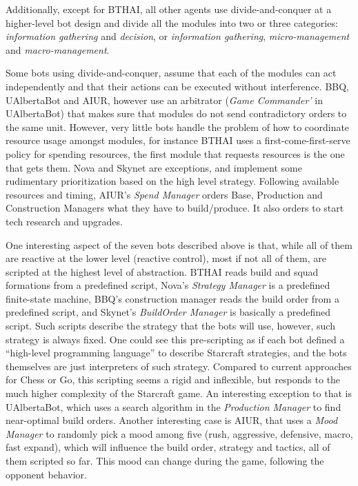 \documentclass[journal]{IEEEtran}
\begin{document}
Additionally, except for BTHAI, all other agents use divide-and-conquer at a higher-level bot design and divide all the modules into two or three categories: {\em information gathering} and {\em decision}, or {\em information gathering}, {\em micro-management} and {\em macro-management}.

Some bots using divide-and-conquer, assume that each of the modules can act independently and that their actions can be executed without interference. BBQ, UAlbertaBot and AIUR, however use an arbitrator ({\em Game Commander'} in UAlbertaBot) that makes sure that modules do not send contradictory orders to the same unit. However, very little bots handle the problem of how to coordinate resource usage amongst modules, for instance BTHAI uses a first-come-first-serve policy for spending resources, the first module that requests resources is the one that gets them. Nova and Skynet are exceptions, and implement some rudimentary prioritization based on the high level strategy. Following available resources and timing, AIUR's {\em Spend Manager} orders Base, Production and Construction Managers what they have to build/produce. It also orders to start tech research and upgrades.

One interesting aspect of the seven bots described above is that, while all of them are reactive at the lower level (reactive control), most if not all of them, are scripted at the highest level of abstraction. BTHAI reads build and squad formations from a predefined script, Nova's {\em Strategy Manager} is a predefined finite-state machine, BBQ's construction manager reads the build order from a predefined script, and Skynet's {\em BuildOrder Manager} is basically a predefined script. Such scripts describe the strategy that the bots will use, however, such strategy is always fixed. One could see this pre-scripting as if each bot defined a ``high-level programming language'' to describe Starcraft strategies, and the bots themselves are just interpreters of such strategy. Compared to current approaches for Chess or Go, this scripting seems a rigid and inflexible, but responds to the much higher complexity of the Starcraft game. An interesting exception to that is UAlbertaBot, which uses a search algorithm in the {\em Production Manager} to find near-optimal build orders. Another interesting case is AIUR, that uses a {\em Mood Manager} to randomly pick a mood among five (rush, aggressive, defensive, macro, fast expand), which will influence the build order, strategy and tactics, all of them scripted so far. This mood can change during the game, following the opponent behavior.
\end{document}

